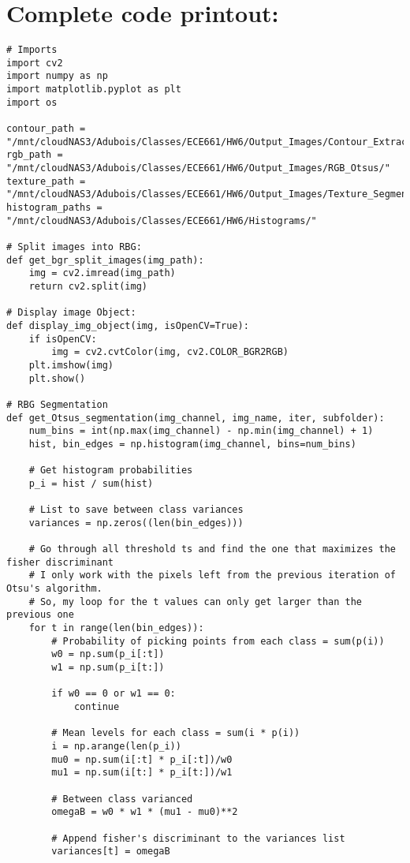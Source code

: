 \documentclass{article}
\begin{document}
\section{Complete code printout:}
\begin{lstlisting}
# Imports
import cv2
import numpy as np
import matplotlib.pyplot as plt
import os

contour_path = "/mnt/cloudNAS3/Adubois/Classes/ECE661/HW6/Output_Images/Contour_Extraction/"
rgb_path = "/mnt/cloudNAS3/Adubois/Classes/ECE661/HW6/Output_Images/RGB_Otsus/"
texture_path = "/mnt/cloudNAS3/Adubois/Classes/ECE661/HW6/Output_Images/Texture_Segmentation/"
histogram_paths = "/mnt/cloudNAS3/Adubois/Classes/ECE661/HW6/Histograms/"

# Split images into RBG:
def get_bgr_split_images(img_path):
    img = cv2.imread(img_path)
    return cv2.split(img)

# Display image Object:
def display_img_object(img, isOpenCV=True):
    if isOpenCV:
        img = cv2.cvtColor(img, cv2.COLOR_BGR2RGB)
    plt.imshow(img)
    plt.show()

# RBG Segmentation
def get_Otsus_segmentation(img_channel, img_name, iter, subfolder):
    num_bins = int(np.max(img_channel) - np.min(img_channel) + 1)
    hist, bin_edges = np.histogram(img_channel, bins=num_bins)
    
    # Get histogram probabilities
    p_i = hist / sum(hist)
    
    # List to save between class variances
    variances = np.zeros((len(bin_edges)))
    
    # Go through all threshold ts and find the one that maximizes the fisher discriminant
    # I only work with the pixels left from the previous iteration of Otsu's algorithm.
    # So, my loop for the t values can only get larger than the previous one
    for t in range(len(bin_edges)):
        # Probability of picking points from each class = sum(p(i))
        w0 = np.sum(p_i[:t])
        w1 = np.sum(p_i[t:])
        
        if w0 == 0 or w1 == 0:
            continue
        
        # Mean levels for each class = sum(i * p(i))
        i = np.arange(len(p_i))
        mu0 = np.sum(i[:t] * p_i[:t])/w0
        mu1 = np.sum(i[t:] * p_i[t:])/w1
        
        # Between class varianced
        omegaB = w0 * w1 * (mu1 - mu0)**2
        
        # Append fisher's discriminant to the variances list
        variances[t] = omegaB
        

\end{lstlisting}
\end{document}
